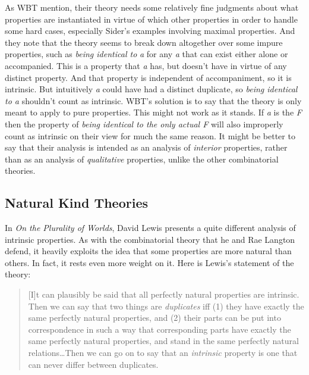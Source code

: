 As WBT mention, their theory needs some relatively fine judgments about what properties are instantiated in virtue of which other properties in order to handle some hard cases, especially Sider's examples involving maximal properties. And they note that the theory seems to break down altogether over some impure properties, such as \textit{being identical to} \textit{a} for any \textit{a} that can exist either alone or accompanied. This is a property that \textit{a} has, but doesn't have in virtue of any distinct property. And that property is independent of accompaniment, so it is intrinsic. But intuitively \textit{a} could have had a distinct duplicate, so \textit{being identical to a} shouldn't count as intrinsic. WBT's solution is to say that the theory is only meant to apply to pure properties. This might not work as it stands. If \textit{a} is the \textit{F} then the property of \textit{being identical to the only actual F} will also improperly count as intrinsic on their view for much the same reason. It might be better to say that their analysis is intended as an analysis of \textit{interior} properties, rather than as an analysis of \textit{qualitative} properties, unlike the other combinatorial theories.

\subsection{Natural Kind Theories}
In \textit{On the Plurality of Worlds}, David Lewis presents a quite different analysis of intrinsic properties. As with the combinatorial theory that he and Rae Langton defend, it heavily exploits the idea that some properties are more natural than others. In fact, it rests even more weight on it. Here is Lewis's statement of the theory:

\begin{quote}
[I]t can plausibly be said that all perfectly natural properties are intrinsic. Then we can say that two things are \textit{duplicates} iff (1) they have exactly the same perfectly natural properties, and (2) their parts can be put into correspondence in such a way that corresponding parts have exactly the same perfectly natural properties, and stand in the same perfectly natural relations{\dots}Then we can go on to say that an \textit{intrinsic} property is one that can never differ between duplicates. \citep[61-62]{Lewis1986a}
\end{quote}

